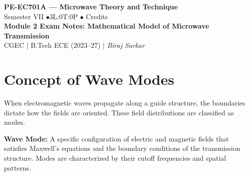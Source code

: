 \documentclass[12pt,a4paper]{article}
\begin{document}

\begin{center}
  {\LARGE\bfseries\color{myred} PE-EC701A --- Microwave Theory and Technique}\\[5pt]
  {\normalsize\color{mydark} Semester VII \quad$\bullet$\quad 3L:0T:0P \quad$\bullet$ Credits}\\[3pt]
  {\normalsize\color{myteal}\textbf{Module 2 Exam Notes: Mathematical Model of Microwave Transmission}}\\[3pt]
  {\small\color{mydark} CGEC \;$|$\; B.Tech ECE (2023--27) \;$|$\; \textit{Biraj Sarkar}}
\end{center}
\vspace{2pt}
\noindent{\color{myred}\rule{\linewidth}{1.5pt}}
\vspace{2pt}

\hypersetup{linkcolor=mydark}
\tableofcontents
\hypersetup{linkcolor=myteal}
\newpage

\section{Concept of Wave Modes}

When electromagnetic waves propagate along a guide structure, the boundaries dictate how the fields are oriented. These field distributions are classified as modes.

\begin{tcolorbox}[defbox]
\textbf{Wave Mode:} A specific configuration of electric and magnetic fields that satisfies Maxwell's equations and the boundary conditions of the transmission structure. Modes are characterized by their cutoff frequencies and spatial patterns.
\end{tcolorbox}
\end{document}
